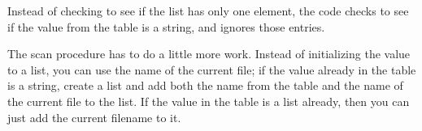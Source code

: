 
Instead of checking to see if the list has only one element, the code
checks to see if the value from the table is a string, and ignores
those entries.

The scan procedure has to do a little more work. Instead of initializing
the value to a list, you can use the name of the current file; if the
value already in the table is a string, create a list and add both the
name from the table and the name of the current file to the list. If
the value in the table is a list already, then you can just add the
current filename to it.


